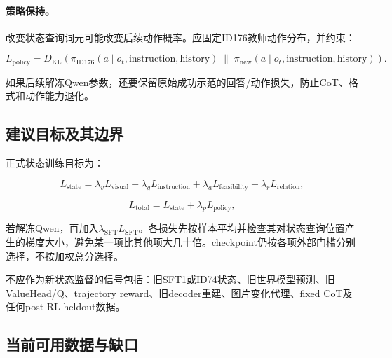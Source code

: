 \documentclass[UTF8,11pt,a4paper,fontset=none]{ctexart}
\begin{document}
\paragraph{策略保持。}
改变状态查询词元可能改变后续动作概率。应固定ID176教师动作分布，并约束：

\begin{equation}
  L_{\mathrm{policy}}
  =D_{\mathrm{KL}}\!\left(
  \pi_{\mathrm{ID176}}(a\mid o_t,\mathrm{instruction},\mathrm{history})
  \;\|\;
  \pi_{\mathrm{new}}(a\mid o_t,\mathrm{instruction},\mathrm{history})
  \right).
\end{equation}

如果后续解冻Qwen参数，还要保留原始成功示范的回答/动作损失，防止CoT、格式和动作能力退化。

\subsection{建议目标及其边界}

正式状态训练目标为：

\begin{equation}
  L_{\mathrm{state}}
  =\lambda_vL_{\mathrm{visual}}
  +\lambda_gL_{\mathrm{instruction}}
  +\lambda_aL_{\mathrm{feasibility}}
  +\lambda_rL_{\mathrm{relation}},
\end{equation}

\begin{equation}
  L_{\mathrm{total}}
  =L_{\mathrm{state}}+\lambda_pL_{\mathrm{policy}},
\end{equation}

若解冻Qwen，再加入$\lambda_{\mathrm{SFT}}L_{\mathrm{SFT}}$。各损失先按样本平均并检查其对状态查询位置产生的梯度大小，避免某一项比其他项大几十倍。checkpoint仍按各项外部门槛分别选择，不按加权总分选择。

不应作为新状态监督的信号包括：旧SFT1或ID74状态、旧世界模型预测、旧ValueHead/Q、trajectory reward、旧decoder重建、图片变化代理、fixed CoT及任何post-RL heldout数据。

\subsection{当前可用数据与缺口}
\end{document}
